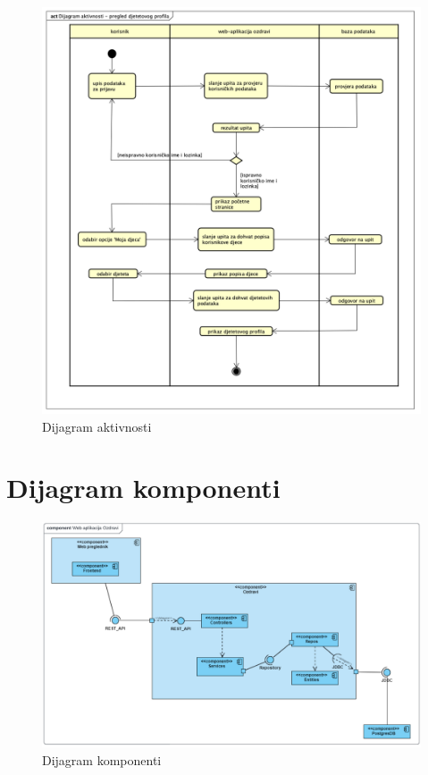 			\begin{figure}[H]
				\includegraphics[width=\textwidth]{slike/DijagramAktivnosti.png} 
				\caption{Dijagram aktivnosti} 
		    \end{figure}
			\eject

		\section{Dijagram komponenti}
		
		
			 \begin{figure}[H]
				\includegraphics[width=\textwidth]{slike/DijagramKomponenti.png} 
				\caption{Dijagram komponenti} 
		    \end{figure}
			\eject